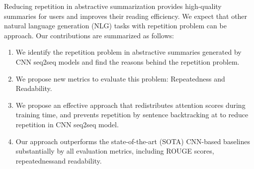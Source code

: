 
\DIFdelend Reducing repetition in abstractive summarization provides high-quality summaries for users and improves their reading efficiency.
We expect that other natural language generation (NLG) tasks with repetition problem can be \DIFdelbegin {}\DIFdelend \DIFaddbegin {}\DIFaddend approach. 
Our contributions are summarized as follows:
\begin{enumerate}
\item We identify the repetition problem in abstractive summaries generated
by CNN seq2seq models and find the reasons behind the repetition problem.
\item We propose new metrics to evaluate this problem: Repeatedness and Readability.
\item We propose an effective approach that redistributes attention scores 
during training time, and prevents repetition by sentence backtracking
at \DIFdelbegin {}\DIFdelend \DIFaddbegin {}\DIFaddend to reduce repetition in CNN seq2seq model.
\item Our approach
outperforms the state-of-the-art (SOTA) CNN-based baselines 
substantially by all evaluation metrics, including ROUGE scores, 
repeatedness\DIFaddbegin {}\DIFaddend and readability.
\end{enumerate}

 \DIFaddbegin {}\DIFaddend